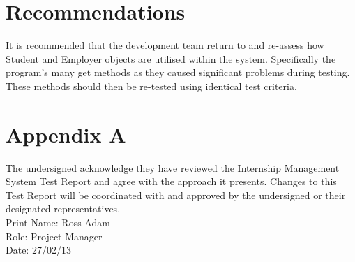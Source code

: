 \documentclass{l3deliverable}
\begin{document}
\section{Recommendations}
It is recommended that the development team return to and re-assess how Student and Employer objects are utilised within the system. Specifically the program's many get methods as they caused significant problems during testing. These methods should then be re-tested using identical test criteria.
\newpage
\section{Appendix A}
The undersigned acknowledge they have reviewed the Internship Management System Test Report and agree with the approach it presents. Changes to this Test Report will be coordinated with and approved by the undersigned or their designated representatives.\\
Print Name: Ross Adam \\
Role: Project Manager \\
Date: 27/02/13\\
\end{document}
